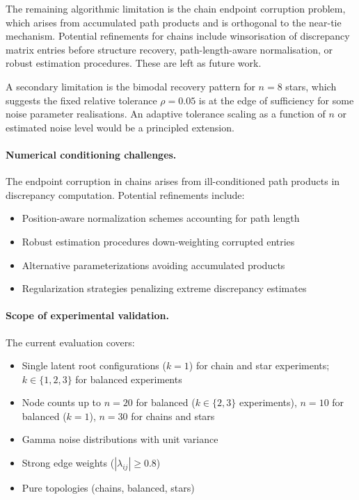 \documentclass[11pt,a4paper]{article}
\numberwithin{equation}{section}
\begin{document}
The remaining algorithmic limitation is the chain endpoint corruption problem, which
arises from accumulated path products and is orthogonal to the near-tie mechanism.
Potential refinements for chains include winsorisation of discrepancy matrix entries
before structure recovery, path-length-aware normalisation, or robust estimation
procedures.  These are left as future work.

A secondary limitation is the bimodal recovery pattern for $n=8$ stars, which suggests
the fixed relative tolerance $\rho = 0.05$ is at the edge of sufficiency for some noise
parameter realisations.  An adaptive tolerance scaling as a function of $n$ or
estimated noise level would be a principled extension.

\paragraph{Numerical conditioning challenges.} The endpoint corruption in chains
arises from ill-conditioned path products in discrepancy computation. Potential
refinements include:
\begin{itemize}
\item Position-aware normalization schemes accounting for path length
\item Robust estimation procedures down-weighting corrupted entries
\item Alternative parameterizations avoiding accumulated products
\item Regularization strategies penalizing extreme discrepancy estimates
\end{itemize}

\paragraph{Scope of experimental validation.}
The current evaluation covers:
\begin{itemize}
\item Single latent root configurations ($k=1$) for chain and star experiments; $k \in \{1,2,3\}$ for balanced experiments
\item Node counts up to $n=20$ for balanced ($k \in \{2,3\}$ experiments), $n=10$ for balanced ($k=1$), $n=30$ for chains and stars
\item Gamma noise distributions with unit variance
\item Strong edge weights ($|\lambda_{ij}| \geq 0.8$)
\item Pure topologies (chains, balanced, stars)
\end{itemize}
\end{document}
